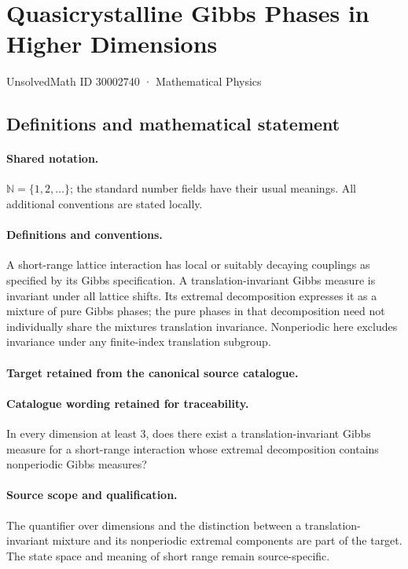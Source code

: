 \documentclass[11pt]{article}
\begin{document}
\setcounter{section}{30002739}
\section{Quasicrystalline Gibbs Phases in Higher Dimensions}\label{30002740}
{\small UnsolvedMath ID 30002740 · Mathematical Physics}
\subsection{Definitions and mathematical statement}

\paragraph{Shared notation.}$\mathbb N=\{1,2,\ldots\}$; the standard number fields have their usual meanings. All additional conventions are stated locally.


\paragraph{Definitions and conventions.}
A short-range lattice interaction has local or suitably decaying couplings as specified by its Gibbs specification. A translation-invariant Gibbs measure is invariant under all lattice shifts. Its extremal decomposition expresses it as a mixture of pure Gibbs phases; the pure phases in that decomposition need not individually share the mixture\textquotesingle s translation invariance. Nonperiodic here excludes invariance under any finite-index translation subgroup.

\paragraph{Target retained from the canonical source catalogue.}
\paragraph{Catalogue wording retained for traceability.}
In every dimension at least $3$, does there exist a translation-invariant Gibbs measure for a short-range interaction whose extremal decomposition contains nonperiodic Gibbs measures?

\paragraph{Source scope and qualification.}
The quantifier over dimensions and the distinction between a translation-invariant mixture and its nonperiodic extremal components are part of the target. The state space and meaning of short range remain source-specific.
\end{document}
